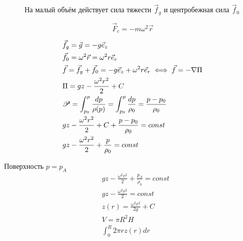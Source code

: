 \begin{figure}[h]
  \centering
   
  \caption{На малый объём действует сила тяжести $\vec f_g$ и центробежная сила $\vec f_0$}
\end{figure}
\[
  \vec{F}_c = -m\omega^2 \vec{r}
\]


\begin{align*}
  &\vec{f}_g = \vec{g} = -g \vec{e}_z \\
  &\vec{f}_0 = \omega^2 \vec{r} = \omega^2 r \vec{e}_r \\
  &\vec{f} = \vec{f}_g + \vec{f}_0 = -g\vec{e}_z + \omega^2 r \vec{e}_r \iff \vec{f} = -\nabla \Pi \\
  &\Pi = gz - \frac{\omega^2r^2}{2} + C\\
  &\P = \int_{p_0}^p \frac{dp}{\rho(p)} = \int_{p_0}^p  \frac{dp}{\rho_0} = \frac{p - p_0}{\rho_0}\\
  &gz - \frac{\omega^2r^2}{2} + C + \frac{p - p_0}{\rho_0} = const \\
  &gz - \frac{\omega^2r^2}{2} + \frac{p}{\rho_0} = const
\end{align*}

Поверхность $p = p_A$
\begin{align*}
  &gz - \frac{\omega^2r^2}{2} + \frac{p_A}{\rho_0} = const \\
  &gz - \frac{\omega^2r^2}{2} = const \\
  &z(r) = \frac{\omega^2r^2}{2g} + C\\
  &V = \pi R^2 H \\
  &\int_0^R 2 \pi r z(r) dr
\end{align*}
